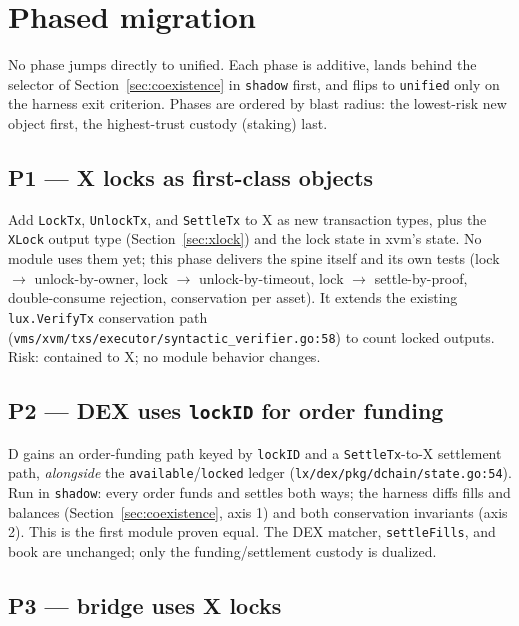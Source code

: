\section{Phased migration}
\label{sec:migration}

No phase jumps directly to unified. Each phase is additive, lands behind
the selector of Section~\ref{sec:coexistence} in \texttt{shadow} first,
and flips to \texttt{unified} only on the harness exit criterion. Phases
are ordered by blast radius: the lowest-risk new object first, the
highest-trust custody (staking) last.

\subsection*{P1 --- X locks as first-class objects}

Add \texttt{LockTx}, \texttt{UnlockTx}, and \texttt{SettleTx} to X as
new transaction types, plus the \texttt{XLock} output type
(Section~\ref{sec:xlock}) and the lock state in xvm's state. No module
uses them yet; this phase delivers the spine itself and its own tests
(lock $\to$ unlock-by-owner, lock $\to$ unlock-by-timeout, lock $\to$
settle-by-proof, double-consume rejection, conservation per asset). It
extends the existing \texttt{lux.VerifyTx} conservation path
(\texttt{vms/xvm/txs/executor/syntactic\_verifier.go:58}) to count
locked outputs. Risk: contained to X; no module behavior changes.

\subsection*{P2 --- DEX uses \texttt{lockID} for order funding}

D gains an order-funding path keyed by \texttt{lockID} and a
\texttt{SettleTx}-to-X settlement path, \emph{alongside} the
\texttt{available}/\texttt{locked} ledger
(\texttt{lx/dex/pkg/dchain/state.go:54}). Run in \texttt{shadow}: every
order funds and settles both ways; the harness diffs fills and balances
(Section~\ref{sec:coexistence}, axis 1) and both conservation invariants
(axis 2). This is the first module proven equal. The DEX matcher,
\texttt{settleFills}, and book are unchanged; only the funding/settlement
custody is dualized.

\subsection*{P3 --- bridge uses X locks}

